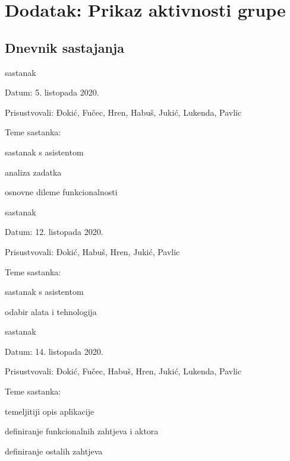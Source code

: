 \chapter*{Dodatak: Prikaz aktivnosti grupe}
		
		\section*{Dnevnik sastajanja}
		\def\djo{Đokić}
		\def\fuc{Fučec}
		\def\hab{Habuš}
		\def\hre{Hren}
		\def\juk{Jukić}
		\def\luk{Lukenda}
		\def\pav{Pavlic}
		\begin{packed_enum}
			\item  sastanak
			
			\item[] \begin{packed_item}
				\item Datum: 5. listopada 2020.
				\item Prisustvovali: \djo, \fuc, \hre, \hab, \juk, \luk, \pav
				\item Teme sastanka:
				\begin{packed_item}
					\item  sastanak s asistentom
					\item  analiza zadatka
					\item  osnovne dileme funkcionalnosti
				\end{packed_item}
			\end{packed_item}
			
			\item  sastanak
			\item[] \begin{packed_item}
				\item Datum: 12. listopada 2020.
				\item Prisustvovali: \djo, \hab, \hre, \juk, \pav
				\item Teme sastanka:
				\begin{packed_item}
					\item  sastanak s asistentom
					\item  odabir alata i tehnologija
				\end{packed_item}
			\end{packed_item}
		
			\item  sastanak
			\item[] \begin{packed_item}
				\item Datum: 14. listopada 2020.
				\item Prisustvovali: \djo, \fuc, \hab, \hre, \juk, \luk, \pav
				\item Teme sastanka:
				\begin{packed_item}
					\item  temeljitiji opis aplikacije
					\item  definiranje funkcionalnih zahtjeva i aktora
					\item  definiranje ostalih zahtjeva
				\end{packed_item}
			\end{packed_item}
		

\end{packed_enum}
